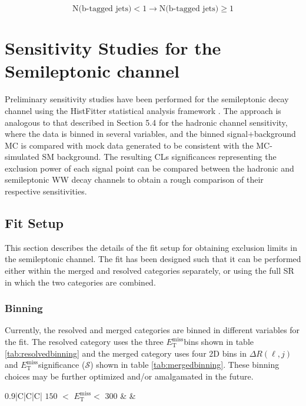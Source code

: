 \documentclass[12pt]{article}
\newcommand*{\met}{\ensuremath{E_\text{T}^\text{miss}}}
\begin{document}
$$
\text{N(b-tagged jets)} <1 \rightarrow \text{N(b-tagged jets)} \geq1
$$

\newpage

\section{Sensitivity Studies for the Semileptonic channel}

Preliminary sensitivity studies have been performed for the semileptonic decay channel using the HistFitter statistical analysis framework \cite{Baak:2014wma}. The approach is analogous to that described in Section 5.4 for the hadronic channel sensitivity, where the data is binned in several variables, and the binned signal+background MC is compared with mock data generated to be consistent with the MC-simulated SM background. The resulting CLs significances representing the exclusion power of each signal point can be compared between the hadronic and semileptonic WW decay channels to obtain a rough comparison of their respective sensitivities. 

\subsection{Fit Setup}

This section describes the details of the fit setup for obtaining exclusion limits in the semileptonic channel. The fit has been designed such that it can be performed either within the merged and resolved categories separately, or using the full SR in which the two categories are combined.

\subsubsection{Binning}

Currently, the resolved and merged categories are binned in different variables for the fit. The resolved category uses the three \met bins shown in table \ref{tab:resolvedbinning} and the merged category uses four 2D bins in $\Delta R(\ell, j)$ and \met significance ($\mathcal{S}$) shown in table \ref{tab:mergedbinning}. These binning choices may be further optimized and/or amalgamated in the future. 

\begin{table}[tb]
  \centering
  \begin{tabularx}{0.9\textwidth}{|C|C|C|}
    \hline
    $150$ $<$ \met $<$ $300$ & \makecell{$300$ $<$ \met $<$ $450$}  & \makecell{\met $>$ 450} \\
    \hline
  \end{tabularx}
  \caption{Binning in \met [GeV] used for the resolved category}
  \label{tab:resolvedbinning}
\end{table}
\end{document}
